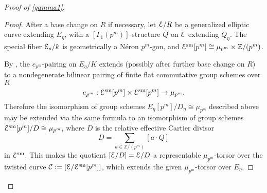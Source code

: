 \documentclass[11pt]{amsart}
\theoremstyle{definition}
\begin{document}
\begin{proof}[Proof of \ref{gamma1}]
\begin{proof}
After a base change on $R$ if necessary, let ${\mathbf{\EuScript{E}}}/R$ be a generalized elliptic curve extending $E_\eta$, with a $[\Gamma_1(p^m)]$-structure $Q$ on ${\mathbf{\EuScript{E}}}$ extending $Q_\eta$. The special fiber ${\mathbf{\EuScript{E}}}_s/k$ is geometrically a N\'eron $p^m$-gon, and ${\mathbf{\EuScript{E}}}^{\mathrm{sm}}[p^m] \cong \mu_{p^m} \times \mathbb{Z}/(p^m)$. 

\begin{center}
\end{center}
By \cite[Theorem 4.1.1]{C}, the $e_{p^m}$-pairing on $E_\eta/K$ extends (possibly after further base change on $R$) to a nondegenerate bilinear pairing of finite flat commutative group schemes over $R$
\begin{displaymath}
e_{p^m}: {\mathbf{\EuScript{E}}}^{\mathrm{sm}}[p^m] \times {\mathbf{\EuScript{E}}}^{\mathrm{sm}}[p^m] \rightarrow \mu_{p^m}.
\end{displaymath}
Therefore the isomorphism of group schemes $E_\eta[p^m]/D_\eta \cong \mu_{p^m}$ described above may be extended via the same formula to an isomorphism of group schemes ${\mathbf{\EuScript{E}}}^{\mathrm{sm}}[p^m]/D \cong \mu_{p^m}$, where $D$ is the relative effective Cartier divisor 
\begin{displaymath}
D = \sum_{a \in \mathbb{Z}/(p^m)} [a \cdot Q]
\end{displaymath}
in ${\mathbf{\EuScript{E}}}^{\mathrm{sm}}$. This makes the quotient $[{\mathbf{\EuScript{E}}}/D] = {\mathbf{\EuScript{E}}}/D$ a representable $\mu_{p^m}$-torsor over the twisted curve ${\mathcal{C}} := [{\mathbf{\EuScript{E}}}/{\mathbf{\EuScript{E}}}^{\mathrm{sm}}[p^m]]$, which extends the given $\mu_{p^m}$-torsor over $E_\eta$.


\end{proof}
\end{proof}
\end{document}
